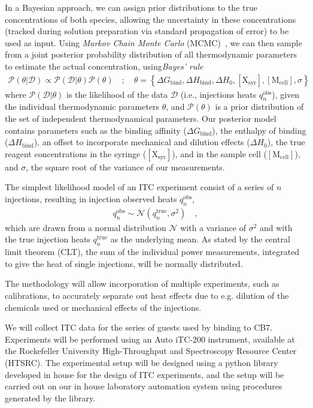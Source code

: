 \documentclass[10pt,final]{article}
\begin{document}
In a Bayesian approach, we can assign prior distributions to the true concentrations of both species, allowing the uncertainty in these concentrations (tracked during solution preparation via standard propagation of error) to be used as input.
Using \textit{Markov Chain Monte Carlo} (MCMC)~\cite{Metropolis1953a,Hastings1970a}, we can then sample from a joint posterior probability distribution of all thermodynamic parameters to estimate the actual concentration, using\textit{Bayes' rule} 
%
\begin{align}
	\mathcal{P}\left(\theta | \mathcal{D} \right) \propto  \mathcal{P}(\mathcal{D} | \theta) \mathcal{P}\left(\theta\right) \quad;\quad \theta   =  \left\{ \Delta G_\mathrm{bind}, \Delta H_\mathrm{bind}, \Delta H_0, [\mathrm{X_{syr}}], [\mathrm{M_{cell}}], \sigma \right\}
\end{align}
%
where $\mathcal{P}(\mathcal{D}|\theta)$ is the likelihood of the data $\mathcal{D}$ (i.e., injections heats $q_n^\mathrm{obs}$), given the individual thermodynamic parameters $\theta$, and $\mathcal{P}(\theta)$ is a prior distribution of the set of independent thermodynamical parameters. Our posterior model contains parameters such as the binding affinity ($\Delta G_\mathrm{bind}$), the enthalpy of binding ($\Delta H_\mathrm{bind}$), an offset to incorporate mechanical and dilution effects ($\Delta H_0$),  the true reagent concentrations in the syringe ($[\mathrm{X_{syr}}]$), and in the sample cell ($[\mathrm{M_{cell}}]$), and $\sigma$, the square root of the variance of our measurements.

The simplest likelihood model of an ITC experiment consist of a series of $n$ injections, resulting in injection observed heats $q_n^\mathrm{obs}$,
%
\begin{align}
	q_n^\mathrm{obs} \sim \mathcal{N}(q_n^\mathrm{true}, \sigma^2) \quad ,
\end{align}
%
which are drawn from a normal distribution $\mathcal{N}$ with a variance of $\sigma^2$ and with the true injection heats $q_n^\mathrm{true}$ as the underlying mean. As stated by the central limit theorem (CLT), the sum of the individual power measurements, integrated to give the heat of single injections, will be normally distributed.

The methodology will allow incorporation of multiple experiments, such as calibrations, to accurately separate out heat effects due to e.g. dilution of the chemicals used or mechanical effects of the injections.

We will collect ITC data for the series of guests used by \textcite{Cao2013a} binding to CB7. Experiments will be performed using an Auto iTC-200 instrument, available at the Rockefeller University High-Throughput and Spectroscopy Resource Center (HTSRC). The experimental setup will be designed using a python library  developed in house for the design of ITC experiments, and the setup will be carried out on our in house laboratory automation system using procedures generated by the library.
\end{document}
